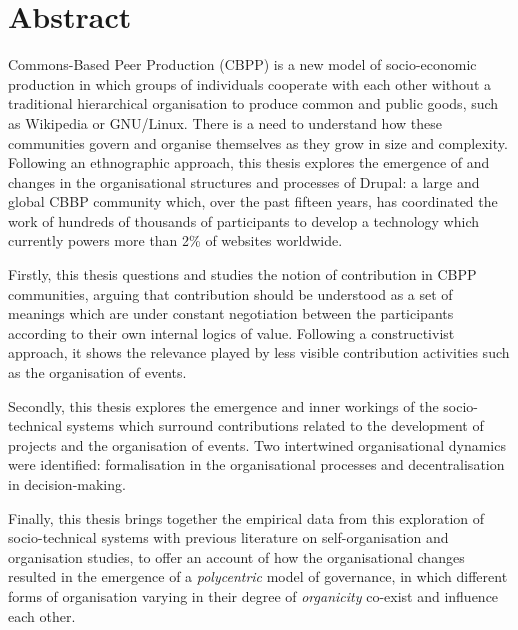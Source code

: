 \section*{Abstract}

Commons-Based Peer Production (CBPP) is a new model of socio-economic production in which groups of individuals cooperate with each other without a traditional hierarchical organisation to produce common and public goods, such as Wikipedia or GNU/Linux. There is a need to understand how these communities govern and organise themselves as they grow in size and complexity. Following an ethnographic approach, this thesis explores the emergence of and changes in the organisational structures and processes of Drupal: a large and global CBBP community which, over the past fifteen years, has coordinated the work of hundreds of thousands of participants to develop a technology which currently powers more than 2\% of websites worldwide.

Firstly, this thesis questions and studies the notion of contribution in CBPP communities, arguing that contribution should be understood as a set of meanings which are under constant negotiation between the participants according to their own internal logics of value. Following a constructivist approach, it shows the relevance played by less visible contribution activities such as the organisation of events.

Secondly, this thesis explores the emergence and inner workings of the socio-technical systems which surround contributions related to the development of projects and the organisation of events. Two intertwined organisational dynamics were identified: formalisation in the organisational processes and decentralisation in decision-making.

Finally, this thesis brings together the empirical data from this exploration of socio-technical systems with previous literature on self-organisation and organisation studies, to offer an account of how the organisational changes resulted in the emergence of a \textit{polycentric} model of governance, in which different forms of organisation varying in their degree of \textit{organicity} co-exist and influence each other.